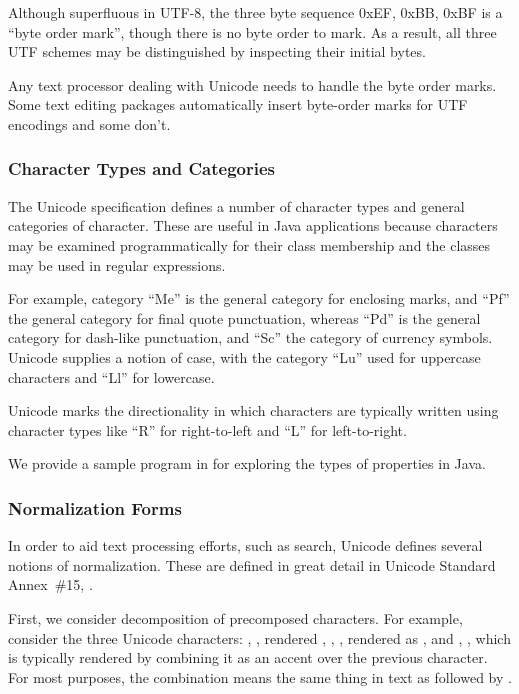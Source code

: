 Although superfluous in UTF-8, the three byte sequence 0xEF, 0xBB,
0xBF is a ``byte order mark'', though there is no byte order to mark.  
As a result, all three UTF schemes may be distinguished by inspecting
their initial bytes.

Any text processor dealing with Unicode needs to handle the byte order
marks.  Some text editing packages automatically insert byte-order
marks for UTF encodings and some don't.

\subsubsection{Character Types and Categories}\label{section:unicode-categories}

The Unicode specification defines a number of character types and
general categories of character.  These are useful in Java
applications because characters may be examined programmatically for
their class membership and the classes may be used in regular
expressions.

For example, category ``Me'' is the general category for enclosing
marks, and ``Pf'' the general category for final quote punctuation,
whereas ``Pd'' is the general category for dash-like punctuation, and
``Sc'' the category of currency symbols.  Unicode supplies a notion of
case, with the category ``Lu'' used for uppercase characters and
``Ll'' for lowercase.

Unicode marks the directionality in which characters are typically
written using character types like ``R'' for right-to-left
and ``L'' for left-to-right.

We provide a sample program in  for
exploring the types of properties in Java.

\subsubsection{Normalization Forms}\label{section:unicode-normalization-forms}

In order to aid text processing efforts, such as search, Unicode
defines several notions of normalization.  These are defined in great
detail in Unicode Standard Annex~\#15, .

First, we consider decomposition of precomposed characters.  For
example, consider the three Unicode characters: ,
, rendered
, , , 
rendered as , and ,
, which is typically rendered
by combining it as an accent over the previous character.  For most
purposes, the combination  means the same thing in text
as  followed by .

